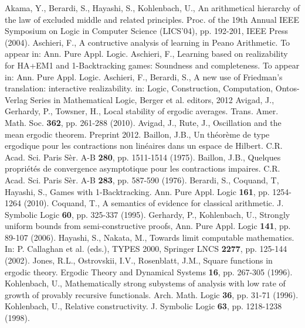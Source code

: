 \documentclass[1p]{elsarticle}
\theoremstyle{plain}
\theoremstyle{definition}
\theoremstyle{remark}
\theoremstyle{definition}
\begin{document}
{\begin{thebibliography}{00}
 Akama, Y., Berardi, S., Hayashi, S., Kohlenbach, U., 
An arithmetical hierarchy of the law of excluded middle and related 
principles. Proc. of the 19th Annual IEEE Symposium on Logic in 
Computer Science (LICS'04), pp. 192-201, IEEE Press (2004).
 Aschieri, F., A contructive analysis of learning 
in Peano Arithmetic. To appear in: Ann. Pure Appl. Logic.
 Aschieri, F., Learning based on realizability 
for HA+EM1 and 1-Backtracking games: Soundness and completeness. 
To appear in: Ann. Pure Appl. Logic.
 Aschieri, F., Berardi, S., 
A new use of Friedman's translation: interactive realizability.  
in: Logic, Construction, Computation, Ontos-Verlag Series in 
Mathematical 
Logic, Berger et al. editors, 2012
 Avigad, J., Gerhardy, P., Towsner, H., 
Local stability of ergodic averages. Trans. Amer. 
Math. Soc. {\bf 362}, pp. 261-288 (2010). 
 Avigad, J., Rute, J., Oscillation and the 
mean ergodic theorem. Preprint 2012.
 Baillon, J.B., Un th\'eor\`eme de type ergodique 
pour les contractions non lin\'eaires dans un espace de Hilbert. 
C.R. Acad. 
Sci. Paris S\`er. A-B {\bf 280}, pp. 1511-1514 (1975).
 Baillon, J.B., Quelques propri\'et\'es de 
convergence asymptotique pour les contractions impaires. 
C.R. Acad. 
Sci. Paris S\`er. A-B {\bf 283}, pp. 587-590 (1976). 
 Berardi, S., Coquand, T, Hayashi, S., 
Games with 1-Backtracking. Ann. Pure Appl. Logic {\bf 161}, pp. 
1254-1264 (2010).
 Coquand, T., A semantics of evidence for classical
arithmetic. J. Symbolic Logic {\bf 60}, pp. 325-337 (1995).
Gerhardy, P., Kohlenbach, U.,  
Strongly uniform bounds from semi-constructive proofs, Ann. Pure Appl. 
Logic {\bf 141}, pp. 89-107 (2006).
 Hayashi, S., Nakata, M., Towards limit computable 
mathematics. In: P. Callaghan et al. (eds.), TYPES 2000, Springer 
LNCS {\bf 2277}, pp. 125-144 (2002).
 Jones, R.L., Ostrovskii, I.V., Rosenblatt, J.M., 
Square functions in ergodic theory. Ergodic Theory and Dynamical 
Systems {\bf 16}, pp. 267-305 (1996).
 Kohlenbach, U., Mathematically strong subystems of analysis with low rate of growth of provably recursive functionals. Arch. Math. Logic {\bf 36}, pp. 31-71 (1996). 
 Kohlenbach, U., Relative constructivity.
J. Symbolic Logic {\bf 63}, pp. 1218-1238 (1998). 

\end{thebibliography}}
\end{document}
